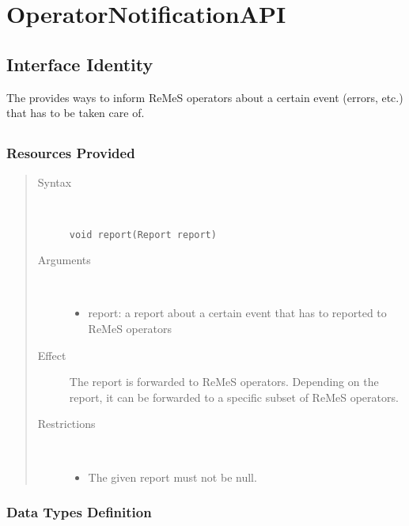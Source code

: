 \section{OperatorNotificationAPI}
\label{api:operator-notification-api}

\subsection{Interface Identity}

\npar The  provides ways to inform ReMeS
operators about a certain event (errors, etc.) that has to be taken care
of.

\subsection{}

\subsubsection{Resources Provided}

\begin{quote}
	\begin{description}
		\item[Syntax] \
		\begin{verbatim}
void report(Report report)
		\end{verbatim}
		\item[Arguments] \
		\begin{itemize}
			\item report: a report about a certain event that has to reported to ReMeS
			operators
		\end{itemize}
		\item[Effect] The report is forwarded to ReMeS operators. Depending on the
		report, it can be forwarded to a specific subset of ReMeS operators. 
		\item[Restrictions] \
		\begin{itemize}
			\item The given report must not be null.
		\end{itemize}
	\end{description} 
\end{quote}

\subsubsection{Data Types Definition}

